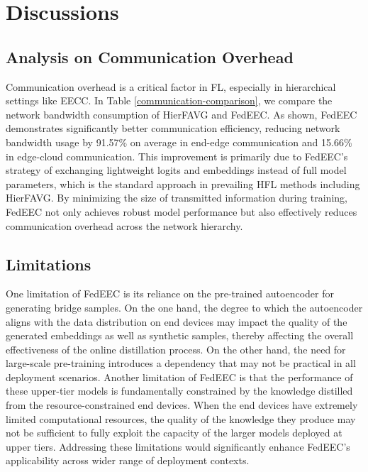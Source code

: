 \documentclass[10pt,journal]{IEEEtran}
\begin{document}
\section{Discussions}
\subsection{Analysis on Communication Overhead}
Communication overhead is a critical factor in FL, especially in hierarchical settings like EECC. In Table \ref{communication-comparison}, we compare the network bandwidth consumption of HierFAVG and FedEEC. As shown, FedEEC demonstrates significantly better communication efficiency, reducing network bandwidth usage by 91.57\% on average in end-edge communication and 15.66\% in edge-cloud communication. This improvement is primarily due to FedEEC’s strategy of exchanging lightweight logits and embeddings instead of full model parameters, which is the standard approach in prevailing HFL methods including HierFAVG. By minimizing the size of transmitted information during training, FedEEC not only achieves robust model performance but also effectively reduces communication overhead across the network hierarchy.





\subsection{Limitations}
One limitation of FedEEC is its reliance on the pre-trained autoencoder for generating bridge samples. On the one hand, the degree to which the autoencoder aligns with the data distribution on end devices may impact the quality of the generated embeddings as well as synthetic samples, thereby affecting the overall effectiveness of the online distillation process. On the other hand, the need for large-scale pre-training introduces a dependency that may not be practical in all deployment scenarios. Another limitation of FedEEC is that the performance of these upper-tier models is fundamentally constrained by the knowledge distilled from the resource-constrained end devices. When the end devices have extremely limited computational resources, the quality of the knowledge they produce may not be sufficient to fully exploit the capacity of the larger models deployed at upper tiers. Addressing these limitations would significantly enhance FedEEC’s applicability across wider range of deployment contexts.
\end{document}
